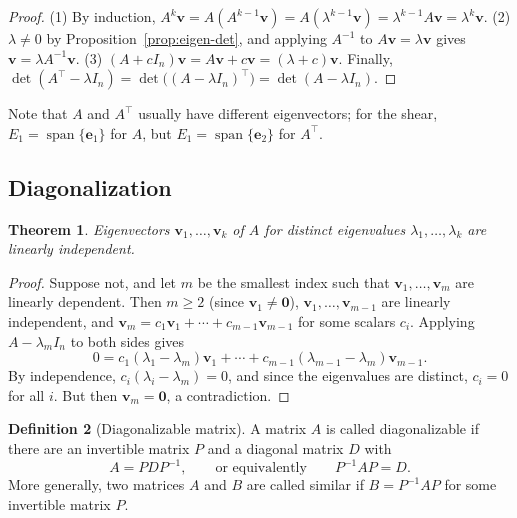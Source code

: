 \documentclass[11pt]{article}
\theoremstyle{definition}
\newtheorem{definition}{Definition}[section]
\theoremstyle{plain}
\newtheorem{theorem}[definition]{Theorem}
\theoremstyle{remark}
\DeclareMathOperator{\Span}{span}
\begin{document}
\begin{proof}
    (1) By induction, $A^k \mathbf{v} = A(A^{k-1} \mathbf{v}) = A(\lambda^{k-1} \mathbf{v}) = \lambda^{k-1} A\mathbf{v} = \lambda^k \mathbf{v}$. (2) $\lambda \neq 0$ by Proposition~\ref{prop:eigen-det}, and applying $A^{-1}$ to $A\mathbf{v} = \lambda \mathbf{v}$ gives $\mathbf{v} = \lambda A^{-1}\mathbf{v}$. (3) $(A + cI_n)\mathbf{v} = A\mathbf{v} + c\mathbf{v} = (\lambda + c)\mathbf{v}$. Finally, $\det(A^\top - \lambda I_n) = \det\big((A - \lambda I_n)^\top\big) = \det(A - \lambda I_n)$.
\end{proof}

Note that $A$ and $A^\top$ usually have different eigenvectors; for the shear, $E_1 = \Span\{\mathbf{e}_1\}$ for $A$, but $E_1 = \Span\{\mathbf{e}_2\}$ for $A^\top$.

\subsection{Diagonalization}

\begin{theorem}\label{thm:eigen-independent}
    Eigenvectors $\mathbf{v}_1, \ldots, \mathbf{v}_k$ of $A$ for distinct eigenvalues $\lambda_1, \ldots, \lambda_k$ are linearly independent.
\end{theorem}

\begin{proof}
    Suppose not, and let $m$ be the smallest index such that $\mathbf{v}_1, \ldots, \mathbf{v}_m$ are linearly dependent. Then $m \geq 2$ (since $\mathbf{v}_1 \neq \mathbf{0}$), $\mathbf{v}_1, \ldots, \mathbf{v}_{m-1}$ are linearly independent, and $\mathbf{v}_m = c_1 \mathbf{v}_1 + \cdots + c_{m-1} \mathbf{v}_{m-1}$ for some scalars $c_i$. Applying $A - \lambda_m I_n$ to both sides gives
    \[0 = c_1 (\lambda_1 - \lambda_m) \mathbf{v}_1 + \cdots + c_{m-1} (\lambda_{m-1} - \lambda_m) \mathbf{v}_{m-1}.\]
    By independence, $c_i (\lambda_i - \lambda_m) = 0$, and since the eigenvalues are distinct, $c_i = 0$ for all $i$. But then $\mathbf{v}_m = \mathbf{0}$, a contradiction.
\end{proof}

\begin{definition}[Diagonalizable matrix]
    A matrix $A$ is called diagonalizable if there are an invertible matrix $P$ and a diagonal matrix $D$ with
    \[A = PDP^{-1}, \qquad \text{or equivalently} \qquad P^{-1}AP = D.\]
    More generally, two matrices $A$ and $B$ are called similar if $B = P^{-1}AP$ for some invertible matrix $P$.
\end{definition}
\end{document}
